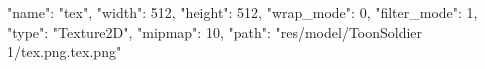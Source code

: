 {
  "name": "tex",
  "width": 512,
  "height": 512,
  "wrap_mode": 0,
  "filter_mode": 1,
  "type": "Texture2D",
  "mipmap": 10,
  "path": "res/model/ToonSoldier 1/tex.png.tex.png"
}